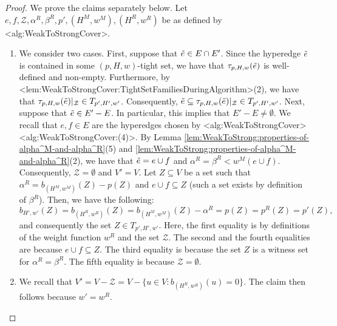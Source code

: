 \documentclass{article}
\def\Cref#1{<#1>}%
\newcommand{\zeros}{\ensuremath{\mathcal{Z}}\xspace}
\newcommand{\maximalTightSetFamily}[1]{\ensuremath{\calT_{#1}}\xspace}
\newcommand{\tightSetFamily}[1]{\ensuremath{T_{#1}}\xspace}
\newcommand{\shubhang}[1]{{\color{blue}[{\tiny Shubhang: \bf #1}]\marginpar{\color{blue}*}}}
\newcommand{\knote}[1]{{\color{red}[{\tiny Karthik: \bf #1}]\marginpar{\color{red}*}}}
\newcommand{\maximalTightSetContainingHyperedge}[1]{\ensuremath{\tau_{#1}}\xspace}
\begin{document}
\begin{proof} We prove the claims separately below. Let $e, f, \zeros, \alpha^R, \beta^R, p', (H^M, w^M), (H^R, w^R)$ be as defined by \Cref{alg:WeakToStrongCover}.
\begin{enumerate}
    \item We consider two cases. First, suppose that $\Tilde{e} \in E \cap E'$. Since the hyperedge $\Tilde{e}$ is contained in some $(p, H, w)$-tight set, we have that $\maximalTightSetContainingHyperedge{p, H, w}(\Tilde{e})$ is well-defined and non-empty. Furthermore, by \Cref{lem:WeakToStrongCover:TightSetFamiliesDuringAlgorithm}(2), we have that $\maximalTightSetContainingHyperedge{p, H, w}(\Tilde{e})|_{\zeros} \in \tightSetFamily{p', H', w'}$. Consequently, $\Tilde{e} \subseteq \maximalTightSetContainingHyperedge{p, H, w}(\Tilde{e})|_{\zeros} \in \tightSetFamily{p', H', w'}$. Next, suppose that $\Tilde{e} \in E' - E$. In particular, this implies that $E' - E \not= \emptyset$. 
    We recall that $e, f \in E$ are the hyperedges chosen by  \Cref{alg:WeakToStrongCover}  \Cref{alg:WeakToStrongCover:(4)}. 
    By Lemma \ref{lem:WeakToStrong:properties-of-alpha^M-and-alpha^R}(5) and \ref{lem:WeakToStrong:properties-of-alpha^M-and-alpha^R}(2), we have that $\Tilde{e} = e\cup f$ and $\alpha^R = \beta^R < w^M(e \cup f)$. Consequently, $\zeros = \emptyset$ and $V' = V$. Let $Z \subseteq V$ be a set such that 
    $\alpha^R = b_{(H^M, w^M)}(Z) - p(Z)$ and $e\cup f \subseteq Z$ (such a set exists by definition of $\beta^R$).
    Then, we have the following: 
    $$b_{H',w'}(Z) = b_{(H^R, w^R)}(Z) = b_{(H^M, w^M)}(Z) - \alpha^R = p(Z) = p^R(Z) = p'(Z),$$
    and consequently the set $Z \in \tightSetFamily{p', H', w'}$.
    Here, the first equality is by definitions of the weight function $w^R$ and the set $\zeros$. The second and the fourth equalities are because $e \cup f \subseteq Z$. The third equality is because the set $Z$ is a witness set for $\alpha^R = \beta^R$. 
    The fifth equality is because $\zeros = \emptyset$.  %

    \item We recall that $V' = V - \zeros = V - \{u\in V : b_{(H^R, w^R)}(u) = 0\}$. The claim then follows because $w' = w^R$. 
    
\end{enumerate}
\end{proof}
\end{document}
